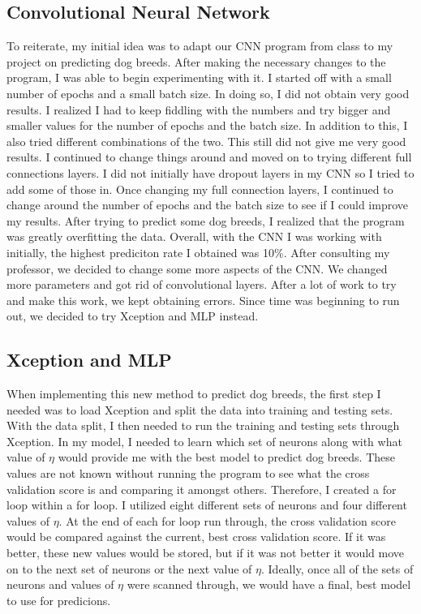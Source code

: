 \documentclass[12pt]{article}
\begin{document}
\subsection{Convolutional Neural Network}
\quad To reiterate, my initial idea was to adapt our CNN program from class to my project on predicting dog breeds.  After making the necessary changes to the program, I was able to begin experimenting with it.  I started off with a small number of epochs and a small batch size.  In doing so, I did not obtain very good results.  I realized I had to keep fiddling with the numbers and try bigger and smaller values for the number of epochs and the batch size.  In addition to this, I also tried different combinations of the two.  This still did not give me very good results.  I continued to change things around and moved on to trying different full connections layers.  I did not initially have dropout layers in my CNN so I tried to add some of those in.  Once changing my full connection layers, I continued to change around the number of epochs and the batch size to see if I could improve my results.  After trying to predict some dog breeds, I realized that the program was greatly overfitting the data.  Overall, with the CNN I was working with initially, the highest prediciton rate I obtained was 10\%.  After consulting my professor, we decided to change some more aspects of the CNN.  We changed more parameters and got rid of convolutional layers.  After a lot of work to try and make this work, we kept obtaining errors.  Since time was beginning to run out, we decided to try Xception and MLP instead.

\subsection{Xception and MLP}
\quad When implementing this new method to predict dog breeds, the first step I needed was to load Xception and split the data into training and testing sets.  With the data split, I then needed to run the training and testing sets through Xception.  In my model, I needed to learn which set of neurons along with what value of $\eta$ would provide me with the best model to predict dog breeds.  These values are not known without running the program to see what the cross validation score is and comparing it amongst others.  Therefore, I created a for loop within a for loop.  I utilized eight different sets of neurons and four different values of $\eta$.  At the end of each for loop run through, the cross validation score would be compared against the current, best cross validation score.  If it was better, these new values would be stored, but if it was not better it would move on to the next set of neurons or the next value of $\eta$.  Ideally, once all of the sets of neurons and values of $\eta$ were scanned through, we would have a final, best model to use for predicions.
\end{document}
